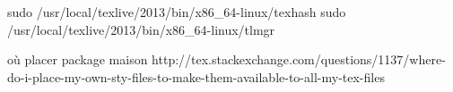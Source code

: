 sudo  /usr/local/texlive/2013/bin/x86_64-linux/texhash
sudo  /usr/local/texlive/2013/bin/x86_64-linux/tlmgr

où placer package maison
http://tex.stackexchange.com/questions/1137/where-do-i-place-my-own-sty-files-to-make-them-available-to-all-my-tex-files

